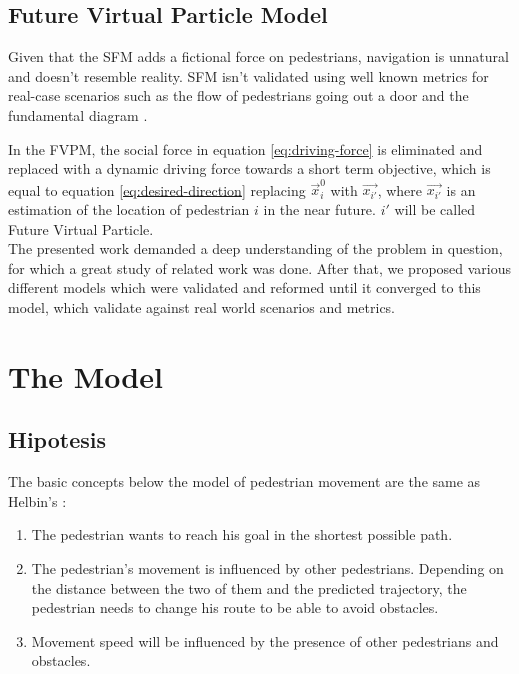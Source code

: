 \documentclass[english]{article}
\begin{document}
    
    \subsection{Future Virtual Particle Model}
    
    Given that the SFM adds a fictional force on pedestrians, navigation
    is unnatural and doesn't resemble reality. SFM isn't validated using
    well known metrics for real-case scenarios such as the flow of pedestrians
    going out a door and the fundamental diagram \cite{key-pari2009}.
    
    In the FVPM, the social force in equation \ref{eq:driving-force}
    is eliminated and replaced with a dynamic driving force towards a
    short term objective, which is equal to equation \ref{eq:desired-direction}
    replacing $\vec{x}_{i}^{0}$ with $\vec{x_{i'}}$, where $\vec{x_{i'}}$
    is an estimation of the location of pedestrian $i$ in the near future.
    $i'$ will be called Future Virtual Particle. \\
    
    The presented work demanded a deep understanding of the problem in question, for which a 
    great study of related work was done. After that, we proposed various different models which
    were validated and reformed until it converged to this model, which validate against real
    world scenarios and metrics.
\section{The Model}
    
    \subsection{Hipotesis}
    
    The basic concepts below the model of pedestrian movement are the same
    as Helbin's \cite{key-helb1995,key-helb2000}:
    
    \begin{enumerate}
        \item The pedestrian wants to reach his goal in the shortest possible path. 
        \item The pedestrian's movement is influenced by other pedestrians. Depending
        on the distance between the two of them and the predicted trajectory,
        the pedestrian needs to change his route to be able to avoid obstacles. 
        \item Movement speed will be influenced by the presence of other pedestrians
        and obstacles. 
    \end{enumerate}
    
\end{document}

